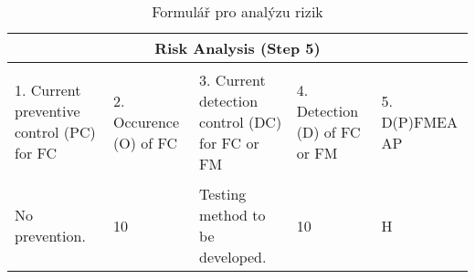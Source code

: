 \begin{center}
\begin{table}[h]
	\centering
	\caption{Formulář pro analýzu rizik }
	\label{tab:risk_FMEA}
\begin{tabular}{|p{6cm}|p{0.5cm}|p{6cm}|p{0.5cm}|p{0.5cm}|  }
 \hline
 \multicolumn{5}{|c|}{Risk Analysis (Step 5)} \\
 \hline
1. Current preventive control (PC) for FC
&
  \begin{turn}{-90}2. Occurence (O) of FC\end{turn} &
3. Current detection control (DC) for FC or FM
 &
  \begin{turn}{-90}4. Detection (D) of FC or FM\end{turn}
 &
  \begin{turn}{-90}5. D(P)FMEA AP\end{turn}

\\
 \hline
No prevention.
& 10
& Testing method to be developed.
& 10
& H


\\
 \hline
\end{tabular}\  
\end{table}
\end{center}

